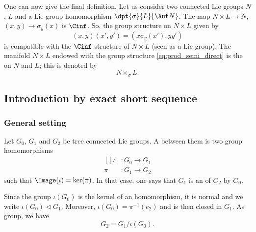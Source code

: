One can now give the final definition. Let us consider two connected Lie groups $N$, $L$ and a Lie group  homomorphism $\dpt{\sigma}{L}{\Aut N}$. The map $N\times L\to N$, $(x,y)\to\sigma_y(x)$ is $\Cinf$. So, the group structure on $N\times L$ given by
\begin{equation}\label{eq:prod_semi_direct}
	(x,y)(x',y')=(x\sigma_y(x'),yy')
\end{equation}
is compatible with the $\Cinf$ structure of $N\times L$ (seen as a Lie group). The manifold $N\times L$ endowed with the group structure \eqref{eq:prod_semi_direct} is the  on $N$ and $L$; this is denoted by
\[
	N\times_{\sigma}L.
\]

\subsection{Introduction by exact short sequence}

\subsubsection{General setting}

Let $G_0$, $G_1$ and $G_2$ be tree connected Lie groups. A  between them is two group homomorphisms
\begin{equation}
	\begin{aligned}[]
		\iota & \colon G_0\to G_1 \\
		\pi   & \colon G_1\to G_2
	\end{aligned}
\end{equation}
such that $\Image(\iota)=\ker(\pi)$. In that case, one says that $G_1$ is an  of $G_2$ by $G_0$.

Since the group $\iota(G_0)$ is the kernel of an homomorphism, it is normal and we write $\iota(G_0)\lhd G_1$. Moreover, $\iota(G_0)=\pi^{-1}(e_2)$ and is then closed in $G_1$. As group, we have
\begin{equation}
	G_2=G_1/\iota(G_0).
\end{equation}

